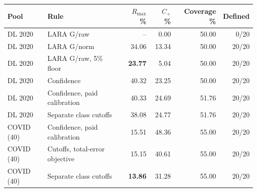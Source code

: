\begin{tabular}{@{}llrrrr@{}}
\toprule
Pool & Rule & $R_{\max}$ \% & $C_+$ \% & Coverage \% & Defined \\
\midrule
DL 2020 & LARA G/raw & -- & 0.00 & 50.00 & 0/20 \\
DL 2020 & LARA G/norm & 34.06 & 13.34 & 50.00 & 20/20 \\
DL 2020 & LARA G/raw, 5\% floor & \textbf{23.77} & 5.04 & 50.00 & 20/20 \\
DL 2020 & Confidence & 40.32 & 23.25 & 50.00 & 20/20 \\
DL 2020 & Confidence, paid calibration & 40.33 & 24.69 & 51.76 & 20/20 \\
DL 2020 & Separate class cutoffs & 38.08 & 24.77 & 51.76 & 20/20 \\
COVID (40) & Confidence, paid calibration & 15.51 & 48.36 & 55.00 & 20/20 \\
COVID (40) & Cutoffs, total-error objective & 15.15 & 40.61 & 55.00 & 20/20 \\
COVID (40) & Separate class cutoffs & \textbf{13.86} & 31.28 & 55.00 & 20/20 \\
\bottomrule
\end{tabular}
